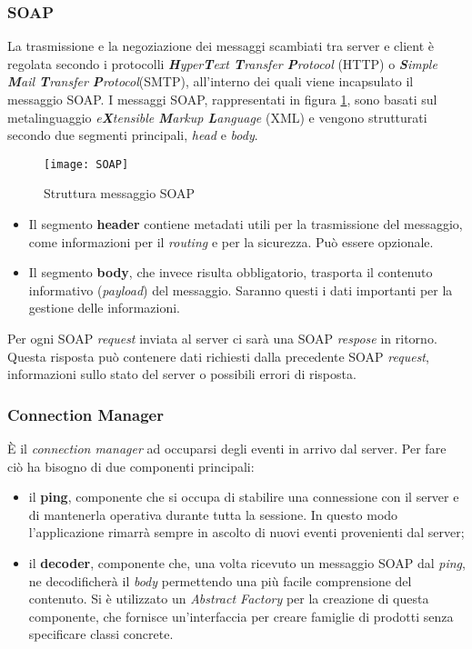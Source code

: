\subsubsection{SOAP}
La trasmissione e la negoziazione dei messaggi scambiati tra server e client è regolata secondo i protocolli \emph{\textbf{H}yper\textbf{T}ext \textbf{T}ransfer \textbf{P}rotocol} (\acrshort{HTTP}) o \emph{\textbf{S}imple \textbf{M}ail \textbf{T}ransfer \textbf{P}rotocol}(\acrshort{SMTP}), all'interno dei quali viene incapsulato il messaggio SOAP.
I messaggi SOAP, rappresentati in figura \ref{fig:SOAP}, sono basati sul metalinguaggio \emph{e\textbf{X}tensible \textbf{M}arkup \textbf{L}anguage} (\acrshort{XML}) e vengono strutturati secondo due segmenti principali, \emph{head} e \emph{body}. 
\begin{figure}[H] 
	\centering
	\texttt{[image: SOAP]}
	\caption{Struttura messaggio SOAP}
	\label{fig:SOAP}
\end{figure}
\begin{itemize}
	\item Il segmento \textbf{header} contiene metadati utili per la trasmissione del messaggio, come informazioni per il \emph{routing} e per la sicurezza. Può essere opzionale.
	\item Il segmento \textbf{body}, che invece risulta obbligatorio, trasporta il contenuto informativo (\emph{payload}) del messaggio. Saranno questi i dati importanti per la gestione delle informazioni.
\end{itemize}
Per ogni SOAP \emph{request} inviata al server ci sarà una SOAP \emph{respose} in ritorno. Questa risposta può contenere dati richiesti dalla precedente SOAP \emph{request}, informazioni sullo stato del server o possibili errori di risposta.
\subsubsection{Connection Manager}
È il \emph{connection manager} ad occuparsi degli eventi in arrivo dal server. Per fare ciò ha bisogno di due componenti principali:
\begin{itemize}
	\item il \textbf{ping}, componente che si occupa di stabilire una connessione con il server e di mantenerla operativa durante tutta la sessione. In questo modo l'applicazione rimarrà sempre in ascolto di nuovi eventi provenienti dal server;
	\item il \textbf{decoder}, componente che, una volta ricevuto un messaggio SOAP dal \emph{ping}, ne decodificherà il \emph{body} permettendo una più facile comprensione del contenuto. Si è utilizzato un \emph{Abstract Factory} per la creazione di questa componente,  che fornisce un’interfaccia per creare famiglie di prodotti senza specificare classi concrete.
\end{itemize}
